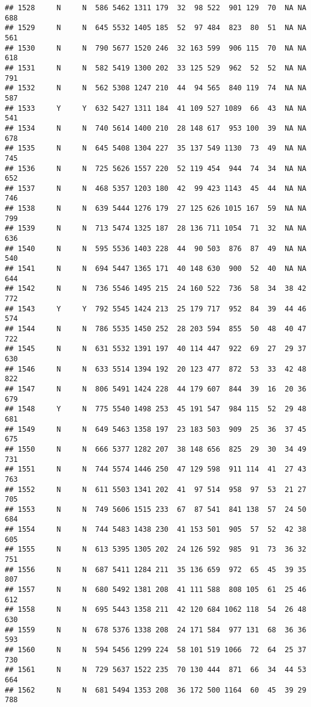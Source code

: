 \documentclass[]{article}
\begin{document}
\begin{verbatim}
## 1528     N     N  586 5462 1311 179  32  98 522  901 129  70  NA NA  688
## 1529     N     N  645 5532 1405 185  52  97 484  823  80  51  NA NA  561
## 1530     N     N  790 5677 1520 246  32 163 599  906 115  70  NA NA  618
## 1531     N     N  582 5419 1300 202  33 125 529  962  52  52  NA NA  791
## 1532     N     N  562 5308 1247 210  44  94 565  840 119  74  NA NA  587
## 1533     Y     Y  632 5427 1311 184  41 109 527 1089  66  43  NA NA  541
## 1534     N     N  740 5614 1400 210  28 148 617  953 100  39  NA NA  678
## 1535     N     N  645 5408 1304 227  35 137 549 1130  73  49  NA NA  745
## 1536     N     N  725 5626 1557 220  52 119 454  944  74  34  NA NA  652
## 1537     N     N  468 5357 1203 180  42  99 423 1143  45  44  NA NA  746
## 1538     N     N  639 5444 1276 179  27 125 626 1015 167  59  NA NA  799
## 1539     N     N  713 5474 1325 187  28 136 711 1054  71  32  NA NA  636
## 1540     N     N  595 5536 1403 228  44  90 503  876  87  49  NA NA  540
## 1541     N     N  694 5447 1365 171  40 148 630  900  52  40  NA NA  644
## 1542     N     N  736 5546 1495 215  24 160 522  736  58  34  38 42  772
## 1543     Y     Y  792 5545 1424 213  25 179 717  952  84  39  44 46  574
## 1544     N     N  786 5535 1450 252  28 203 594  855  50  48  40 47  722
## 1545     N     N  631 5532 1391 197  40 114 447  922  69  27  29 37  630
## 1546     N     N  633 5514 1394 192  20 123 477  872  53  33  42 48  822
## 1547     N     N  806 5491 1424 228  44 179 607  844  39  16  20 36  679
## 1548     Y     N  775 5540 1498 253  45 191 547  984 115  52  29 48  681
## 1549     N     N  649 5463 1358 197  23 183 503  909  25  36  37 45  675
## 1550     N     N  666 5377 1282 207  38 148 656  825  29  30  34 49  731
## 1551     N     N  744 5574 1446 250  47 129 598  911 114  41  27 43  763
## 1552     N     N  611 5503 1341 202  41  97 514  958  97  53  21 27  705
## 1553     N     N  749 5606 1515 233  67  87 541  841 138  57  24 50  684
## 1554     N     N  744 5483 1438 230  41 153 501  905  57  52  42 38  605
## 1555     N     N  613 5395 1305 202  24 126 592  985  91  73  36 32  751
## 1556     N     N  687 5411 1284 211  35 136 659  972  65  45  39 35  807
## 1557     N     N  680 5492 1381 208  41 111 588  808 105  61  25 46  612
## 1558     N     N  695 5443 1358 211  42 120 684 1062 118  54  26 48  630
## 1559     N     N  678 5376 1338 208  24 171 584  977 131  68  36 36  593
## 1560     N     N  594 5456 1299 224  58 101 519 1066  72  64  25 37  730
## 1561     N     N  729 5637 1522 235  70 130 444  871  66  34  44 53  664
## 1562     N     N  681 5494 1353 208  36 172 500 1164  60  45  39 29  788

\end{verbatim}
\end{document}
